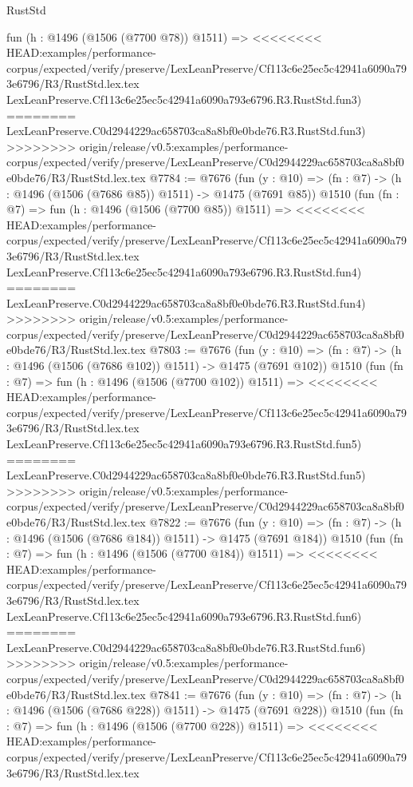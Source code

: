 \begin{lexlean}{RustStd}
\begin{coremodule}
{\begin{coremodule}
{{{{{{{{{{{{{    fun (h : @1496 (@1506 (@7700 @78)) @1511) =>
<<<<<<<< HEAD:examples/performance-corpus/expected/verify/preserve/LexLeanPreserve/Cf113c6e25ec5c42941a6090a793e6796/R3/RustStd.lex.tex
    LexLeanPreserve.Cf113c6e25ec5c42941a6090a793e6796.R3.RustStd.fun3)
========
    LexLeanPreserve.C0d2944229ac658703ca8a8bf0e0bde76.R3.RustStd.fun3)
>>>>>>>> origin/release/v0.5:examples/performance-corpus/expected/verify/preserve/LexLeanPreserve/C0d2944229ac658703ca8a8bf0e0bde76/R3/RustStd.lex.tex
@7784 := @7676
    (fun (y : @10) => (fn : @7) -> (h : @1496 (@1506 (@7686 @85)) @1511) -> @1475 (@7691 @85))
    @1510
    (fun (fn : @7) =>
    fun (h : @1496 (@1506 (@7700 @85)) @1511) =>
<<<<<<<< HEAD:examples/performance-corpus/expected/verify/preserve/LexLeanPreserve/Cf113c6e25ec5c42941a6090a793e6796/R3/RustStd.lex.tex
    LexLeanPreserve.Cf113c6e25ec5c42941a6090a793e6796.R3.RustStd.fun4)
========
    LexLeanPreserve.C0d2944229ac658703ca8a8bf0e0bde76.R3.RustStd.fun4)
>>>>>>>> origin/release/v0.5:examples/performance-corpus/expected/verify/preserve/LexLeanPreserve/C0d2944229ac658703ca8a8bf0e0bde76/R3/RustStd.lex.tex
@7803 := @7676
    (fun (y : @10) => (fn : @7) -> (h : @1496 (@1506 (@7686 @102)) @1511) -> @1475 (@7691 @102))
    @1510
    (fun (fn : @7) =>
    fun (h : @1496 (@1506 (@7700 @102)) @1511) =>
<<<<<<<< HEAD:examples/performance-corpus/expected/verify/preserve/LexLeanPreserve/Cf113c6e25ec5c42941a6090a793e6796/R3/RustStd.lex.tex
    LexLeanPreserve.Cf113c6e25ec5c42941a6090a793e6796.R3.RustStd.fun5)
========
    LexLeanPreserve.C0d2944229ac658703ca8a8bf0e0bde76.R3.RustStd.fun5)
>>>>>>>> origin/release/v0.5:examples/performance-corpus/expected/verify/preserve/LexLeanPreserve/C0d2944229ac658703ca8a8bf0e0bde76/R3/RustStd.lex.tex
@7822 := @7676
    (fun (y : @10) => (fn : @7) -> (h : @1496 (@1506 (@7686 @184)) @1511) -> @1475 (@7691 @184))
    @1510
    (fun (fn : @7) =>
    fun (h : @1496 (@1506 (@7700 @184)) @1511) =>
<<<<<<<< HEAD:examples/performance-corpus/expected/verify/preserve/LexLeanPreserve/Cf113c6e25ec5c42941a6090a793e6796/R3/RustStd.lex.tex
    LexLeanPreserve.Cf113c6e25ec5c42941a6090a793e6796.R3.RustStd.fun6)
========
    LexLeanPreserve.C0d2944229ac658703ca8a8bf0e0bde76.R3.RustStd.fun6)
>>>>>>>> origin/release/v0.5:examples/performance-corpus/expected/verify/preserve/LexLeanPreserve/C0d2944229ac658703ca8a8bf0e0bde76/R3/RustStd.lex.tex
@7841 := @7676
    (fun (y : @10) => (fn : @7) -> (h : @1496 (@1506 (@7686 @228)) @1511) -> @1475 (@7691 @228))
    @1510
    (fun (fn : @7) =>
    fun (h : @1496 (@1506 (@7700 @228)) @1511) =>
<<<<<<<< HEAD:examples/performance-corpus/expected/verify/preserve/LexLeanPreserve/Cf113c6e25ec5c42941a6090a793e6796/R3/RustStd.lex.tex
}}}}}}}}}}}}}
\end{coremodule}}
\end{coremodule}
\end{lexlean}
